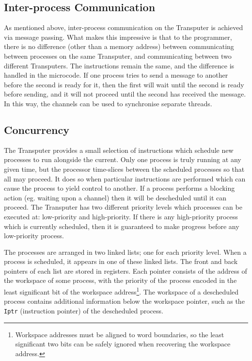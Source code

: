 \subsection{Inter-process Communication}

As mentioned above, inter-process communication on the Transputer is achieved
via message passing. What makes this impressive is that to the programmer, there
is no difference (other than a memory address) between communicating between
processes on the same Transputer, and communicating between two different
Transputers. The instructions remain the same, and the difference is handled in
the microcode. If one process tries to send a message to another before the
second is ready for it, then the first will wait until the second is ready
before sending, and it will not proceed until the second has received the
message. In this way, the channels can be used to synchronise separate threads.

\subsection{Concurrency}

The Transputer provides a small selection of instructions which schedule new
processes to run alongside the current. Only one process is truly running at any
given time, but the processor time-slices between the scheduled processes so
that all may proceed. It does so when particular instructions are performed
which can cause the process to yield control to another. If a process performs a
blocking action (eg. waiting upon a channel) then it will be descheduled until
it can proceed. The Transputer has two different priority levels which processes
can be executed at: low-priority and high-priority. If there is any
high-priority process which is currently scheduled, then it is guaranteed to
make progress before any low-priority process.

The processes are arranged in two linked lists; one for each priority level.
When a process is scheduled, it appears in one of these linked lists. The front
and back pointers of each list are stored in registers. Each pointer consists of
the address of the workspace of some process, with the priority of the process
encoded in the least significant bit of the workspace address\footnote{Workspace
addresses must be aligned to word boundaries, so the least significant two bits
can be safely ignored when recovering the workspace address.}. The workspace of
a descheduled process contains additional information below the workspace
pointer, such as the \texttt{Iptr} (instruction pointer) of the descheduled
process.

